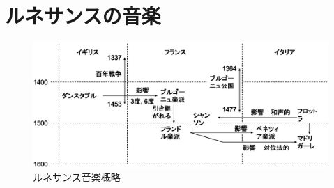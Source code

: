 \documentclass[a4j]{jarticle}
\begin{document}
\section{ルネサンスの音楽}

\begin{figure}[tb]
 \begin{center}
  \includegraphics[width=\hsize]{fig/renaissance_summary.eps}
  \caption{ルネサンス音楽概略}
  \label{fig:renaissance_summary}
 \end{center}
\end{figure}
\end{document}
